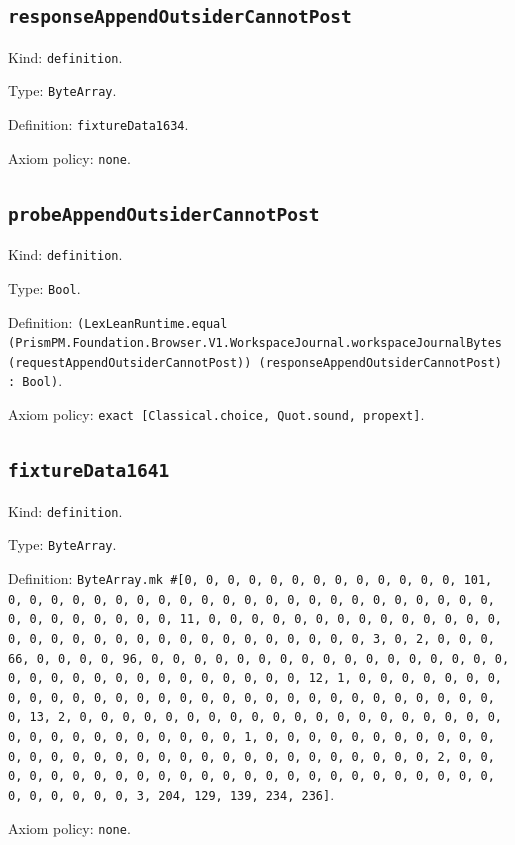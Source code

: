 \documentclass[11pt]{article}
\begin{document}
\subsection*{\texttt{responseAppendOutsiderCannotPost}}
\noindent Kind: \texttt{definition}.\par
\noindent Type: \texttt{ByteArray}.\par
\noindent Definition: \texttt{fixtureData1634}.\par
\noindent Axiom policy: \texttt{none}.\par
\subsection*{\texttt{probeAppendOutsiderCannotPost}}
\noindent Kind: \texttt{definition}.\par
\noindent Type: \texttt{Bool}.\par
\noindent Definition: \texttt{(LexLeanRuntime.equal (PrismPM.Foundation.Browser.V1.WorkspaceJournal.workspaceJournalBytes (requestAppendOutsiderCannotPost)) (responseAppendOutsiderCannotPost) : Bool)}.\par
\noindent Axiom policy: \texttt{exact [Classical.choice, Quot.sound, propext]}.\par
\subsection*{\texttt{fixtureData1641}}
\noindent Kind: \texttt{definition}.\par
\noindent Type: \texttt{ByteArray}.\par
\noindent Definition: \texttt{ByteArray.mk \#[0, 0, 0, 0, 0, 0, 0, 0, 0, 0, 0, 0, 0, 101, 0, 0, 0, 0, 0, 0, 0, 0, 0, 0, 0, 0, 0, 0, 0, 0, 0, 0, 0, 0, 0, 0, 0, 0, 0, 0, 0, 0, 0, 0, 0, 11, 0, 0, 0, 0, 0, 0, 0, 0, 0, 0, 0, 0, 0, 0, 0, 0, 0, 0, 0, 0, 0, 0, 0, 0, 0, 0, 0, 0, 0, 0, 0, 3, 0, 2, 0, 0, 0, 66, 0, 0, 0, 0, 96, 0, 0, 0, 0, 0, 0, 0, 0, 0, 0, 0, 0, 0, 0, 0, 0, 0, 0, 0, 0, 0, 0, 0, 0, 0, 0, 0, 0, 0, 0, 0, 12, 1, 0, 0, 0, 0, 0, 0, 0, 0, 0, 0, 0, 0, 0, 0, 0, 0, 0, 0, 0, 0, 0, 0, 0, 0, 0, 0, 0, 0, 0, 0, 0, 13, 2, 0, 0, 0, 0, 0, 0, 0, 0, 0, 0, 0, 0, 0, 0, 0, 0, 0, 0, 0, 0, 0, 0, 0, 0, 0, 0, 0, 0, 0, 0, 0, 1, 0, 0, 0, 0, 0, 0, 0, 0, 0, 0, 0, 0, 0, 0, 0, 0, 0, 0, 0, 0, 0, 0, 0, 0, 0, 0, 0, 0, 0, 0, 0, 2, 0, 0, 0, 0, 0, 0, 0, 0, 0, 0, 0, 0, 0, 0, 0, 0, 0, 0, 0, 0, 0, 0, 0, 0, 0, 0, 0, 0, 0, 0, 0, 3, 204, 129, 139, 234, 236]}.\par
\noindent Axiom policy: \texttt{none}.\par
\end{document}
